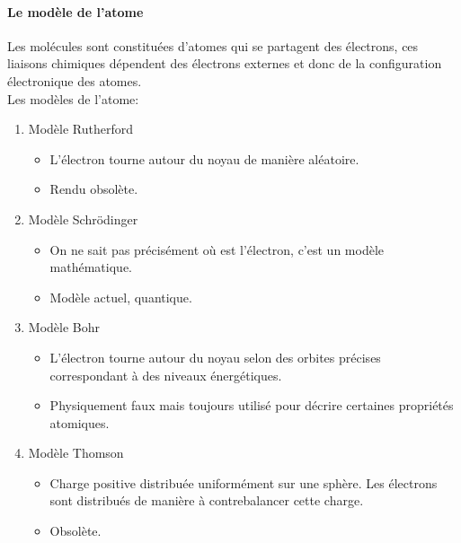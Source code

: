 \documentclass[10pt,a4paper]{book}
\begin{document}
\paragraph{Le modèle de l'atome}
Les molécules sont constituées d'atomes qui se partagent des électrons, ces liaisons chimiques dépendent des électrons externes et donc de la configuration électronique des atomes. \\
Les modèles de l'atome:
\begin{enumerate}
\item Modèle Rutherford
\begin{itemize}
\item L'électron tourne autour du noyau de manière aléatoire.
\item Rendu obsolète.
\end{itemize}
\item Modèle Schrödinger
\begin{itemize}
\item On ne sait pas précisément où est l’électron, c'est un modèle mathématique.
\item Modèle actuel, quantique.
\end{itemize}
\item Modèle Bohr
\begin{itemize}
\item L'électron tourne autour du noyau selon des orbites précises correspondant à des niveaux énergétiques.
\item Physiquement faux mais toujours utilisé pour décrire certaines propriétés atomiques.
\end{itemize}
\item Modèle Thomson
\begin{itemize}
\item Charge positive distribuée uniformément sur une sphère. Les électrons sont distribués de manière à contrebalancer cette charge.
\item Obsolète.
\end{itemize}
\end{enumerate}
\newpage
\end{document}
